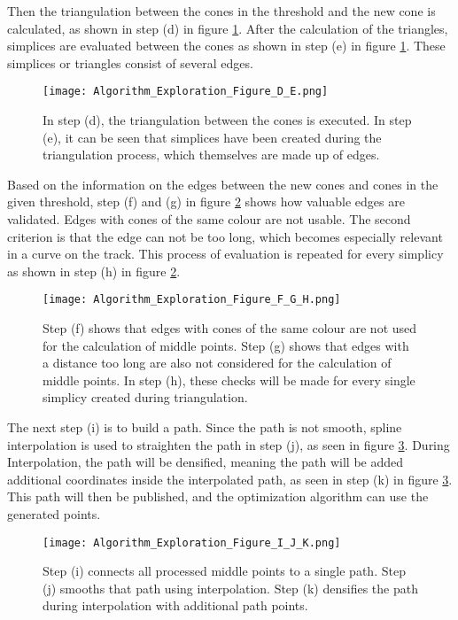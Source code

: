 Then the triangulation between the cones in the threshold and the new cone is calculated, as shown in step (d) in figure \ref{fig:Algorithm Exploration Figure D and E}. After the calculation of the triangles, simplices are evaluated between the cones as shown in step (e) in figure \ref{fig:Algorithm Exploration Figure D and E}. These simplices or triangles consist of several edges.
\begin{figure}[H]
    \centering
    \texttt{[image: Algorithm\_Exploration\_Figure\_D\_E.png]}
    \caption{In step (d), the triangulation between the cones is executed. In step (e), it can be seen that simplices have been created during the triangulation process, which themselves are made up of edges.}
    \label{fig:Algorithm Exploration Figure D and E}
\end{figure}

Based on the information on the edges between the new cones and cones in the given threshold, step (f) and (g) in figure \ref{fig:Algorithm Exploration Figure F, G and H} shows how valuable edges are validated. Edges with cones of the same colour are not usable. The second criterion is that the edge can not be too long, which becomes especially relevant in a curve on the track. This process of evaluation is repeated for every simplicy as shown in step (h) in figure \ref{fig:Algorithm Exploration Figure F, G and H}.
\begin{figure}[H]
    \centering
    \texttt{[image: Algorithm\_Exploration\_Figure\_F\_G\_H.png]}
    \caption{Step (f) shows that edges with cones of the same colour are not used for the calculation of middle points. Step (g) shows that edges with a distance too long are also not considered for the calculation of middle points. In step (h), these checks will be made for every single simplicy created during triangulation.}
    \label{fig:Algorithm Exploration Figure F, G and H}
\end{figure}

The next step (i) is to build a path. Since the path is not smooth, spline interpolation is used to straighten the path in step (j), as seen in figure \ref{fig:Algorithm Exploration Figure I, J and K}. During Interpolation, the path will be densified, meaning the path will be added additional coordinates inside the interpolated path, as seen in step (k) in figure \ref{fig:Algorithm Exploration Figure I, J and K}. This path will then be published, and the optimization algorithm can use the generated points.
\begin{figure}[H]
    \centering
    \texttt{[image: Algorithm\_Exploration\_Figure\_I\_J\_K.png]}
    \caption{Step (i) connects all processed middle points to a single path. Step (j) smooths that path using interpolation. Step (k) densifies the path during interpolation with additional path points.}
    \label{fig:Algorithm Exploration Figure I, J and K}
\end{figure}

